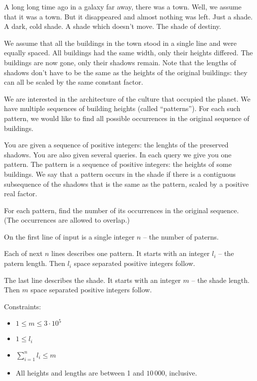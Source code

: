 

A long long time ago in a galaxy far away, there was a town.
Well, we assume that it was a town.
But it disappeared and almost nothing was left.
Just a shade. A dark, cold shade.
A shade which doesn't move.
The shade of destiny.

We assume that all the buildings in the town stood in a single line and were equally spaced.
All buildings had the same width, only their heights differed.
The buildings are now gone, only their shadows remain.
Note that the lengths of shadows don't have to be the same as the heights of the original buildings:
they can all be scaled by the same constant factor.

We are interested in the architecture of the culture that occupied the planet.
We have multiple sequences of building heights (called ``patterns'').
For each such pattern, we would like to find all possible occurrences in the original sequence of buildings.


You are given a sequence of positive integers: the lenghts of the preserved shadows.
You are also given several queries.
In each query we give you one pattern.
The pattern is a sequence of positive integers: the heights of some buildings.
We say that a pattern occurs in the shade if there is a contiguous subsequence of the shadows
that is the same as the pattern, scaled by a positive real factor.

For each pattern, find the number of its occurrences in the original sequence.
(The occurrences are allowed to overlap.)


On the first line of input is a single integer $n$
-- the number of paterns.

Each of next $n$ lines describes one pattern.
It starts with an integer $l_i$ -- the patern length.
Then $l_i$ space separated positive integers follow.

The last line describes the shade.
It starts with an integer $m$ -- the shade length.
Then $m$ space separated positive integers follow.

\bigskip

Constraints:
\begin{itemize}\itemsep -2pt
\item
$1 \leq m \leq 3\cdot10^5$
\item
$1 \leq l_i$
\item
$\sum^{n}_{i=1} l_i \leq m$
\item
All heights and lengths are between 1 and $10\,000$, inclusive.
\end{itemize}

